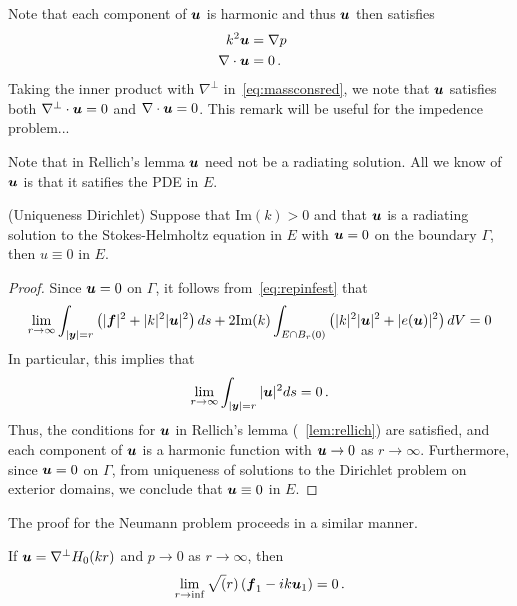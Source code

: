 \begin{remark}
Note that each component of ${\boldsymbol u}$ is harmonic and thus ${\boldsymbol u}$ then satisfies
\begin{align}
k^2 {\boldsymbol u} &= \nabla p  \quad \label{eq:massconsred} \\
\nabla \cdot {\boldsymbol u} &= 0 \, .
\end{align}
Taking the inner product with $\nabla^{\perp}$ in~\cref{eq:massconsred}, 
we note that ${\boldsymbol u}$ satisfies both $\nabla^{\perp} \cdot {\boldsymbol u} = 0$ 
and $\nabla \cdot {\boldsymbol u} = 0$.
This remark will be useful for the impedence problem...
\end{remark}
\begin{remark}
Note that in Rellich's lemma ${\boldsymbol u}$ need not be a radiating solution. 
All we know of ${\boldsymbol u}$ is that it satifies the PDE in $E$.
\end{remark}

\begin{thm}
(Uniqueness Dirichlet)
Suppose that $\text{Im}(k)>0$ and 
that ${\boldsymbol u}$ is a radiating solution to the Stokes-Helmholtz
equation in $E$ with ${\boldsymbol u} =0$ on the boundary $\Gamma$, then
$u \equiv 0$ in $E$.
\end{thm}

\begin{proof}
Since ${\boldsymbol u} = 0$ on $\Gamma$, it follows from~\cref{eq:repinfest} that
\begin{equation}
\lim_{r\to\infty}
\int_{|{\boldsymbol y}|=r} \left( |{\boldsymbol f}|^2 + |k|^2 |{\boldsymbol u}|^2 \right) ds +
2 \text{Im}(k) \int_{E \cap B_{r}(0)} \left(|k|^2 |{\boldsymbol u}|^2 + |e({\boldsymbol u})|^2 \right)
dV = 0
\end{equation} 
In particular, this implies that
\begin{equation}
\lim_{r\to\infty} \int_{|{\boldsymbol y}|=r} |{\boldsymbol u}|^2 ds = 0 \, .
\end{equation}
Thus, the conditions for ${\boldsymbol u}$ in Rellich's lemma (~\cref{lem:rellich})
are satisfied, and each component of ${\boldsymbol u}$ is a harmonic function
with ${\boldsymbol u} \to 0$ as $r \to \infty$. Furthermore, since ${\boldsymbol u}=0$ on
$\Gamma$, from uniqueness of solutions to the Dirichlet problem
on exterior domains, we conclude that ${\boldsymbol u} \equiv 0$ in $E$.
\end{proof}

The proof for the Neumann problem proceeds in a similar manner. 

\begin{lem}
If ${\boldsymbol u} = \nabla^{\perp} H_{0}(k r)$ and $p\to 0$ as $r\to \infty$, 
then
\begin{equation}
\lim_{r\to \inf} \sqrt(r) \left({\boldsymbol f}_{1} - ik {\boldsymbol u}_{1} \right) = 0 \, .
\end{equation}
\end{lem}

